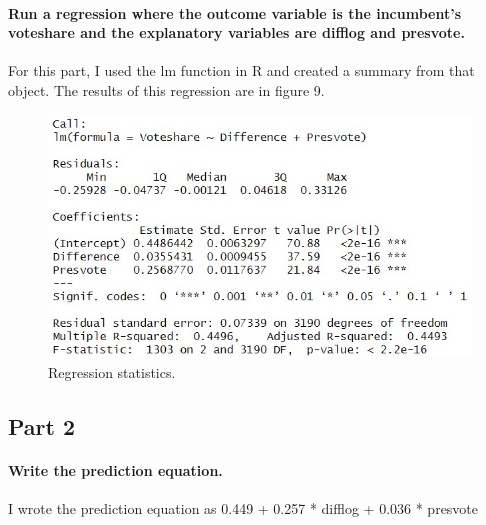 \documentclass{article}
\begin{document}
\paragraph{Run a regression where the outcome variable is the incumbent's voteshare and the explanatory variables are difflog and presvote.}
For this part, I used the lm function in R and created a summary from that object.  The results of this regression are in figure 9.
\begin{figure}[H]
	\centering
	\includegraphics[width=0.9\linewidth]{Question5RegressionAnalysis.jpg}
	\caption{Regression statistics.}
	\label{fig:Regression stats}
\end{figure}
\subsection{Part 2}
\paragraph{Write the prediction equation.}
I wrote the prediction equation as 0.449 + 0.257 * difflog + 0.036 * presvote
\end{document}

